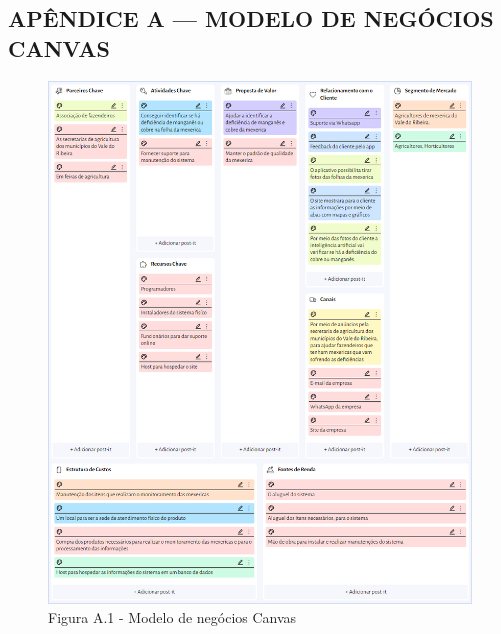 
\begin{Appendix}

    \section{APÊNDICE A — MODELO DE NEGÓCIOS CANVAS}%
    \label{sect:apx-a1}
    
    \begin{figure}[H]
    \centering
    \caption{Figura A.1 -  Modelo de negócios Canvas}%
    \label{fig:canvaspi}
    \includegraphics[width=0.8\linewidth]{Illustrations/canvas.png}
    \end{figure}
    
\end{Appendix}
    
    
\printindex%
    
